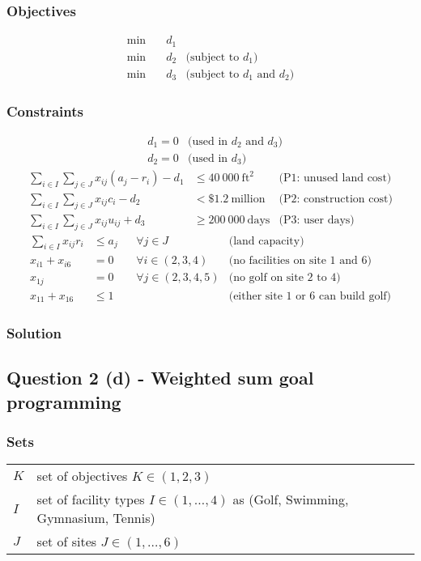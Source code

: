 \documentclass[a4paper,11pt]{article}
\begin{document}
\subsubsection{Objectives}
\begin{align}
\min \quad & d_1 & \\
\min \quad & d_2 & \text{(subject to $d_1$)}\\
\min \quad & d_3 & \text{(subject to $d_1$ and $d_2$)}
\end{align}

\subsubsection{Constraints}

\begin{align}
& d_1=0 & \text{(used in $d_2$ and $d_3$)} \\
& d_2=0 & \text{(used in $d_3$)}
\end{align}
\begin{align}
\sum_{i\in I} \sum_{j\in J} x_{ij}(a_j-r_i) -d_1& \leq 40\ 000\ \text{ft}^2  & \text{(P1: unused land cost)} \\
 \sum_{i\in I} \sum_{j\in J} x_{ij}c_i - d_2& < \$1.2\  \text{million} & \text{(P2: construction cost)} \\
\sum_{i\in I} \sum_{j\in J} x_{ij}u_{ij} +d_3 & \geq 200\ 000\ \text{days}  & \text{(P3: user days)} 
\end{align}
\begin{align}
\sum_{i\in I} x_{ij}r_i &\leq a_j && \forall j\in J & \text{(land capacity)}        \\
x_{i1}+x_{i6} &= 0  && \forall i \in (2,3,4)  & \text{(no facilities on site 1 and 6)}\\
x_{1j} &= 0 && \forall j\in (2,3,4,5) & \text{(no golf on site 2 to 4)}\\
x_{11} + x_{16} &\leq 1 && & \text{(either site 1 or 6 can build golf)}
\end{align}
\subsubsection{Solution}

\newpage
\subsection{Question 2 (d) - Weighted sum goal programming}
\subsubsection{Sets}
\begin{tabular}{lll}
	$K$ & set of objectives $K \in (1,2,3)$\\
	$I$ & set of facility types $I \in (1,\dots,4)$ as (Golf, Swimming, Gymnasium, Tennis)\\
$J$ & set of sites $J \in (1,\dots, 6)$ 
\end{tabular}
\end{document}
